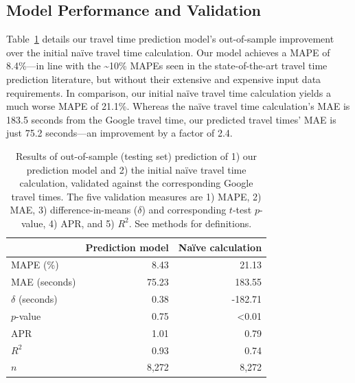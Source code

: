 \documentclass[12pt,letterpaper]{article} %
\begin{document}
    \subsection{Model Performance and Validation}

    Table~\ref{tab:validation_results} details our travel time prediction model's out-of-sample improvement over the initial naïve travel time calculation. Our model achieves a MAPE of 8.4\%---in line with the \textasciitilde10\% MAPEs seen in the state-of-the-art travel time prediction literature, but without their extensive and expensive input data requirements. In comparison, our initial naïve travel time calculation yields a much worse MAPE of 21.1\%. Whereas the naïve travel time calculation's MAE is 183.5 seconds from the Google travel time, our predicted travel times' MAE is just 75.2 seconds---an improvement by a factor of 2.4.

    \begin{table}[tb!]
        \centering
        \caption{Results of out-of-sample (testing set) prediction of 1) our prediction model and 2) the initial naïve travel time calculation, validated against the corresponding Google travel times. The five validation measures are 1) MAPE, 2) MAE, 3) difference-in-means ($\delta$) and corresponding $t$-test $p$-value, 4) APR, and 5) $R^2$. See methods for definitions.}\label{tab:validation_results}
        \begin{tabular}{lrr}
            \toprule
            & Prediction model & Naïve calculation \\
            \midrule
            MAPE (\%)                     &             8.43 &             21.13 \\
            MAE (seconds)                 &            75.23 &            183.55 \\
            $\delta$ (seconds)            &             0.38 &           -182.71 \\
            $p$-value                     &             0.75 &             <0.01 \\
            APR                           &             1.01 &              0.79 \\
            $R^2$                         &             0.93 &              0.74 \\
            \midrule
            $n$                           &           8,272 &            8,272 \\
            \bottomrule
        \end{tabular}
    \end{table}
\end{document}
